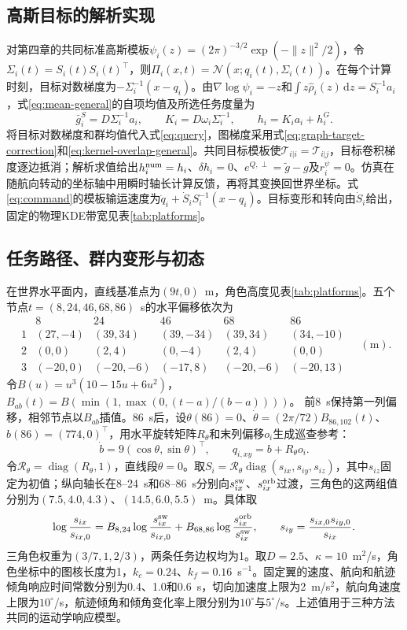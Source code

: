 \documentclass[UTF8,a4paper,11pt,fontset=none]{ctexart}
\newcommand{\diag}{\operatorname{diag}}\newcommand{\col}{\operatorname{col}}
\begin{document}
\subsection{高斯目标的解析实现}\label{app:gaussian-implementation}
对第四章的共同标准高斯模板$\psi_i(z)=(2\pi)^{-3/2}\exp(-\|z\|^2/2)$，令$\Sigma_i(t)=S_i(t)S_i(t)^\top$，则$\Pi_i(x,t)=\mathcal N(x;q_i(t),\Sigma_i(t))$。在每个计算时刻，目标对数梯度为$-\Sigma_i^{-1}(x-q_i)$。由$\nabla\log\psi_i=-z$和$\int z\widehat\rho_i(z)\,\mathrm dz=S_i^{-1}a_i$，式\eqref{eq:mean-general}的自项均值及所选任务度量为
\begin{equation}
\bar g_i^S=D\Sigma_i^{-1}a_i,\qquad
K_i=D\omega_i\Sigma_i^{-1},\qquad h_i=K_i a_i+h_i^G .
\label{eq:exact-mean}
\end{equation}
将目标对数梯度和群均值代入式\eqref{eq:query}，图梯度采用式\eqref{eq:graph-target-correction}和\eqref{eq:kernel-overlap-general}。共同目标模板使$\mathcal T_{i|i}=\mathcal T_{i|j}$，目标卷积梯度逐边抵消；解析求值给出$h_i^{\rm num}=h_i$、$\delta h_i=0$、$e^{Q,\perp}=\widetilde g-g$及$r_i^\psi=0$。仿真在随航向转动的坐标轴中用瞬时轴长计算反馈，再将其变换回世界坐标。式\eqref{eq:command}的模板输运速度为$\dot q_i+\dot S_i S_i^{-1}(x-q_i)$。目标变形和转向由$\dot S_i$给出，固定的物理KDE带宽见表\ref{tab:platforms}。

\subsection{任务路径、群内变形与初态}
在世界水平面内，直线基准点为$(9t,0)$~m，角色高度见表\ref{tab:platforms}。五个节点$t=(8,24,46,68,86)$~s的水平偏移依次为
\[
\begin{array}{c|ccccc}
 &8&24&46&68&86\\ \hline
1&(27,-4)&(39,34)&(39,-34)&(39,34)&(34,-10)\\
2&(0,0)&(2,4)&(0,-4)&(2,4)&(0,0)\\
3&(-20,0)&(-20,-6)&(-17,8)&(-20,-6)&(-20,13)
\end{array}\quad(\mathrm m).
\]
令$B(u)=u^3(10-15u+6u^2)$，$B_{ab}(t)=B(\min(1,\max(0,(t-a)/(b-a))))$。
前8~s保持第一列偏移，相邻节点以$B_{ab}$插值。86~s后，设$\theta(86)=0$、$\dot\theta=(2\pi/72)B_{86,102}(t)$、$b(86)=(774,0)^\top$，用水平旋转矩阵$R_\theta$和末列偏移$o_i$生成巡查参考：
\begin{equation}
 \dot b=9(\cos\theta,\sin\theta)^\top,\qquad q_{i,xy}=b+R_\theta o_i .
 \label{eq:engineering-reference}
\end{equation}
令$\mathcal R_\theta=\diag(R_\theta,1)$，直线段$\theta=0$。取$S_i=\mathcal R_\theta\diag(s_{ix},s_{iy},s_{iz})$，其中$s_{iz}$固定为初值；纵向轴长在8--24~s和68--86~s分别向$s_{ix}^{\rm sw}$、$s_{ix}^{\rm orb}$过渡，三角色的这两组值分别为$(7.5,4.0,4.3)$、$(14.5,6.0,5.5)$~m。具体取
\[
 \log\frac{s_{ix}}{s_{ix,0}}
 =B_{8,24}\log\frac{s_{ix}^{\rm sw}}{s_{ix,0}}
 +B_{68,86}\log\frac{s_{ix}^{\rm orb}}{s_{ix}^{\rm sw}},\qquad
 s_{iy}=\frac{s_{ix,0}s_{iy,0}}{s_{ix}} .
\]
三角色权重为$(3/7,1,2/3)$，两条任务边权均为1。取$D=2.5$、$\kappa=10$~m$^2$/s，角色坐标中的图核长度为1，$k_c=0.24$、$k_f=0.16$~s$^{-1}$。固定翼的速度、航向和航迹倾角响应时间常数分别为0.4、1.0和0.6~s，切向加速度上限为2~m/s$^2$，航向角速度上限为$10^\circ$/s，航迹倾角和倾角变化率上限分别为$10^\circ$与$5^\circ$/s。上述值用于三种方法共同的运动学响应模型。
\end{document}
